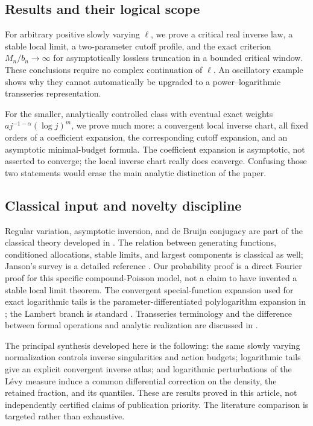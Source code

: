 \documentclass[11pt,a4paper]{article}
\numberwithin{equation}{section}
\theoremstyle{definition}\newtheorem{definition}[theorem]{Definition}
\theoremstyle{remark}\newtheorem{remark}[theorem]{Remark}
\theoremstyle{definition}
\begin{document}
\subsection{Results and their logical scope}
For arbitrary positive slowly varying $\ell$, we prove a critical real inverse
law, a stable local limit, a two-parameter cutoff profile, and the exact
criterion $M_n/b_n\to\infty$ for asymptotically lossless truncation in a bounded
critical window. These conclusions require no complex continuation of $\ell$.
An oscillatory example shows why they cannot automatically be upgraded to a
power--logarithmic transseries representation.

For the smaller, analytically controlled class with eventual exact weights
$a j^{-1-\alpha}(\log j)^m$, we prove much more: a convergent local inverse
chart, all fixed orders of a coefficient expansion, the corresponding
cutoff expansion, and an asymptotic minimal-budget formula. The coefficient
expansion is asymptotic, not asserted to converge; the local inverse chart
really does converge. Confusing those two statements would erase the main
analytic distinction of the paper.

\subsection{Classical input and novelty discipline}
Regular variation, asymptotic inversion, and de Bruijn conjugacy are part of
the classical theory developed in \cite{bgt}. The relation between generating
functions, conditioned allocations, stable limits, and largest components
is classical as well; Janson's survey is a detailed reference
\cite{janson}. Our probability proof is a direct Fourier proof for this
specific compound-Poisson model, not a claim to have invented a stable local
limit theorem. The convergent special-function expansion used for exact
logarithmic tails is the parameter-differentiated polylogarithm expansion
in \cite{dlmf-polylog}; the Lambert branch is standard \cite{dlmf-lambert}.
Transseries terminology and the difference between formal operations and
analytic realization are discussed in \cite{edgar}.

The principal synthesis developed here is the following: the same slowly
varying normalization controls inverse singularities and action budgets;
logarithmic tails give an explicit convergent inverse atlas; and logarithmic
perturbations of the L\'evy measure induce a common differential correction
on the density, the retained fraction, and its quantiles. These are results
proved in this article, not independently certified claims of publication
priority. The literature comparison is targeted rather than exhaustive.
\end{document}
